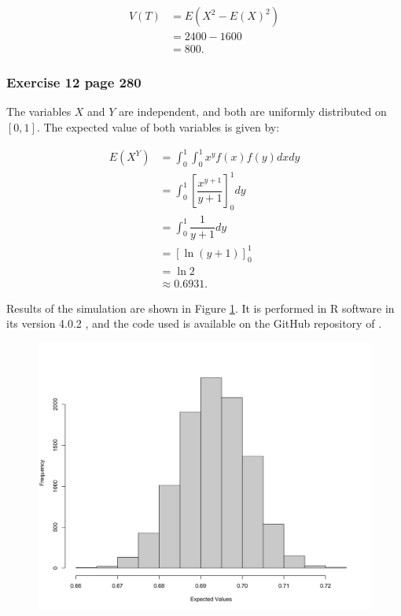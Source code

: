 \documentclass[10pt,leter,openany]{article}
\begin{document}
\begin{equation*}
	\begin{aligned}
		V(T) & = E(X^{2} - E(X)^{2})\\
		& = 2400 - 1600\\
		& = 800.
	\end{aligned}	
\end{equation*}


\subsubsection*{Exercise 12 page 280}

The variables $ X $ and $ Y $ are independent, and both are uniformly distributed on $\left[ 0,1\right]$.  The expected value of both variables is given by:

	\begin{equation*}
	\begin{aligned}
		E(X^{Y}) & = \int_{0}^{1}\int_{0}^{1} x ^{y}f(x)f(y)  dx dy\\
		& = \int_{0}^{1} \left[ \dfrac{x^{y+1}}{y+1}\right] ^{1}_{0} dy\\
		& = \int_{0}^{1} \dfrac{1}{y+1} dy\\
		& = \left[ \ln (y+1) \right] ^{1}_{0}\\
		& = \ln 2\\
		& \approx 0.6931.
	\end{aligned}	
\end{equation*}

Results of the simulation are shown in Figure \ref{fig:hist12p280}. It is performed in R software in its version 4.0.2 \citep{r}, and the code used is available on the GitHub repository of \citep{github}.

	\begin{figure}
	\begin{center}
		\includegraphics[scale=0.18]{hist}
		\label{fig:hist12p280}
	\end{center}
\end{figure}
\end{document}

